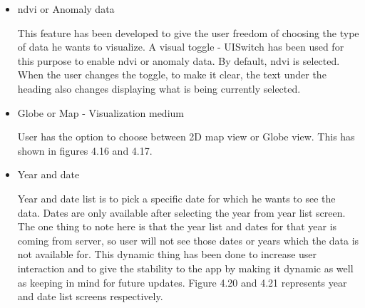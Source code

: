 \begin{itemize}
    \item \gls{ndvi} or Anomaly data
    
    This feature has been developed to give the user freedom of choosing the type of data he wants to visualize. A visual toggle - UISwitch has been used for this purpose to enable \gls{ndvi} or anomaly data. By default, \gls{ndvi} is selected. When the user changes the toggle, to make it clear, the text under the heading also changes displaying what is being currently selected. 
  
    \item Globe or Map - Visualization medium
    
    User has the option to choose between 2D map view or Globe view.
    This has shown in figures 4.16 and 4.17. \\
    
    \item Year and date
    
    Year and date list is to pick a specific date for which he wants to see the data. Dates are only available after selecting the year from year list screen. The one thing to note here is that the year list and dates for that year is coming from server, so user will not see those dates or years which the data is not available for.
    This dynamic thing has been done to increase user interaction and to give the stability to the app by making it dynamic as well as keeping in mind for future updates. Figure 4.20 and 4.21 represents year and date list screens respectively.
    
    \newpage
    

\end{itemize}
